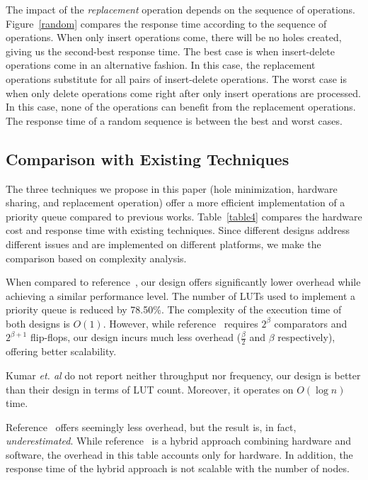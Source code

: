 The impact of the {\it replacement} operation depends on the sequence of operations.
Figure~\ref{random} compares the response time according to the sequence of operations.
When only insert operations come, there will be no holes created, giving us the second-best response time.
The best case is when insert-delete operations come in an alternative fashion.
In this case, the replacement operations substitute for all pairs of insert-delete operations.
The worst case is when only delete operations come right after only insert operations are processed.
In this case, none of the operations can benefit from the replacement operations.
The response time of a random sequence is between the best and worst cases.

\subsection{Comparison with Existing Techniques}

The three techniques we propose in this paper (hole minimization, hardware sharing, and replacement operation) offer a more efficient implementation of a priority queue compared to previous works.
Table~\ref{table4} compares the hardware cost and response time with existing techniques.
Since different designs address different issues and are implemented on different platforms, we make the comparison based on complexity analysis.

When compared to reference~\cite{hw8}, our design offers significantly lower overhead while achieving a similar performance level.
The number of LUTs used to implement a priority queue is reduced by 78.50\%.
The complexity of the execution time of both designs is $O(1)$.
However, while reference~\cite{hw8} requires $2^\beta$ comparators and $2^{\beta+1}$ flip-flops, our design incurs much less overhead ($\frac{\beta}{2}$ and $\beta$ respectively), offering better scalability.

Kumar {\it et. al} \cite{hwsw1} do not report neither throughput nor frequency, our design is better than their design in terms of LUT count. Moreover, it operates on $O(\log n)$ time.

Reference~\cite{fpga2} offers seemingly less overhead, but the result is, in fact, {\it underestimated}.
While reference~\cite{fpga2} is a hybrid approach combining hardware and software, the overhead in this table accounts only for hardware.
In addition, the response time of the hybrid approach is not scalable with the number of nodes.


